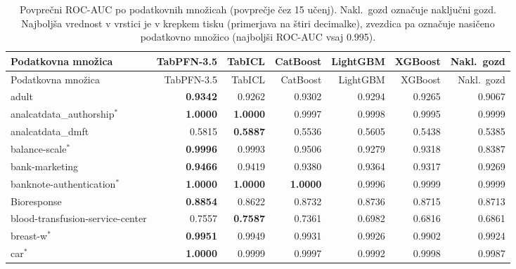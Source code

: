 {\scriptsize
\setlength{\tabcolsep}{3pt}
\begin{longtable}{>{\raggedright\arraybackslash}p{3.3cm}rrrrrr}
\caption{Povprečni ROC-AUC po podatkovnih množicah (povprečje čez 15 učenj). Nakl.\ gozd označuje naključni gozd. Najboljša vrednost v vrstici je v krepkem tisku (primerjava na štiri decimalke), zvezdica pa označuje nasičeno podatkovno množico (najboljši ROC-AUC vsaj \num{0.995}).}
\label{tab:mnozice} \\
\hline
Podatkovna množica & TabPFN-3.5 & TabICL & CatBoost & LightGBM & XGBoost & Nakl.\ gozd \\
\hline
\endfirsthead
\hline
Podatkovna množica & TabPFN-3.5 & TabICL & CatBoost & LightGBM & XGBoost & Nakl.\ gozd \\
\hline
\endhead
\hline
\endfoot
adult & \textbf{\num{0.9342}} & \num{0.9262} & \num{0.9302} & \num{0.9294} & \num{0.9265} & \num{0.9067} \\
analcatdata\_\allowbreak authorship$^{*}$ & \textbf{\num{1.0000}} & \textbf{\num{1.0000}} & \num{0.9997} & \num{0.9998} & \num{0.9995} & \num{0.9999} \\
analcatdata\_\allowbreak dmft & \num{0.5815} & \textbf{\num{0.5887}} & \num{0.5536} & \num{0.5605} & \num{0.5438} & \num{0.5385} \\
balance-scale$^{*}$ & \textbf{\num{0.9996}} & \num{0.9993} & \num{0.9506} & \num{0.9279} & \num{0.9318} & \num{0.8387} \\
bank-marketing & \textbf{\num{0.9466}} & \num{0.9419} & \num{0.9380} & \num{0.9364} & \num{0.9317} & \num{0.9269} \\
banknote-authentication$^{*}$ & \textbf{\num{1.0000}} & \textbf{\num{1.0000}} & \textbf{\num{1.0000}} & \num{0.9996} & \num{0.9999} & \num{0.9999} \\
Bioresponse & \textbf{\num{0.8854}} & \num{0.8622} & \num{0.8732} & \num{0.8736} & \num{0.8715} & \num{0.8713} \\
blood-transfusion-service-center & \num{0.7557} & \textbf{\num{0.7587}} & \num{0.7361} & \num{0.6982} & \num{0.6816} & \num{0.6861} \\
breast-w$^{*}$ & \textbf{\num{0.9951}} & \num{0.9949} & \num{0.9931} & \num{0.9926} & \num{0.9902} & \num{0.9924} \\
car$^{*}$ & \textbf{\num{1.0000}} & \num{0.9999} & \num{0.9997} & \num{0.9992} & \num{0.9998} & \num{0.9987} \\

\end{longtable}}
